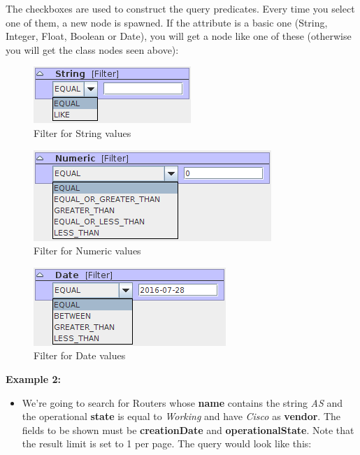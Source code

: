 \documentclass[a4paper]{article}
\begin{document}
	The checkboxes are used to construct the query predicates. Every time you select one of them, a new node is spawned. If the attribute is a basic one (String, Integer, Float, Boolean or Date), you will get a node like one of these (otherwise you will get the class nodes seen above):
	\begin{figure}[h!]
		\centering
		\includegraphics[width=0.3\linewidth]{img/query_string_filter.png}
		\caption{Filter for String values}
		\label{fig:query_string_filter}
	\end{figure}
	\begin{figure}[h!]
		\centering
		\includegraphics[width=0.4\linewidth]{img/query_filter_numeric.png}
		\caption{Filter for Numeric values}
		\label{fig:query_filter_numeric}
	\end{figure}
	\begin{figure}[h!]
		\centering
		\includegraphics[width=0.3\linewidth]{img/query_date_filter.png}
		\caption{Filter for Date values}
		\label{fig:query_date_filter}
	\end{figure}
	\newpage
	\begin{framed} {\large \textbf{Example 2:}}
		\begin{itemize}
			\item We're going to search for Routers whose \textbf{name} contains the string \textit{AS} and the operational \textbf{state} is equal to \textit{Working} and have \textit{Cisco} as \textbf{vendor}. The fields to be shown must be \textbf{creationDate} and \textbf{operationalState}. Note that the result limit is set to 1 per page.
			The query would look like this:
		\end{itemize}
	\end{framed}
	
\end{document}
